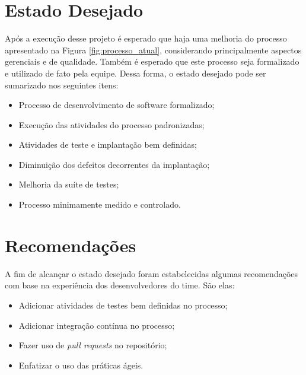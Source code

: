 \section{Estado Desejado}

Após a execução desse projeto é esperado que haja uma melhoria do processo apresentado na Figura \ref{fig:processo_atual}, 
considerando principalmente aspectos gerenciais e de qualidade. Também é esperado que este processo seja formalizado e utilizado
de fato pela equipe. Dessa forma, o estado desejado pode ser sumarizado nos seguintes itens:

\begin{itemize}
	\item Processo de desenvolvimento de software formalizado;
	\item Execução das atividades do processo padronizadas;
	\item Atividades de teste e implantação bem definidas;
	\item Diminuição dos defeitos decorrentes da implantação;
	\item Melhoria da suíte de testes;
	\item Processo minimamente medido e controlado.

\end{itemize}

	
\section{Recomendações}

A fim de alcançar o estado desejado foram estabelecidas algumas recomendações com base na experiência dos desenvolvedores do time.
São elas: 

\begin{itemize}
    \item Adicionar atividades de testes bem definidas no processo;
    \item Adicionar integração contínua no processo;
    \item Fazer uso de \textit{pull requests} no repositório;
    \item Enfatizar o uso das práticas ágeis.
\end{itemize}
